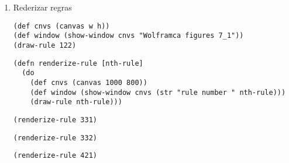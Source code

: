 \documentclass[11pt]{article}
\begin{document}
\begin{enumerate}
\begin{verbatim}
(defn draw-cells
  "Draw cells."
  [canvas rule]
  (loop [cells (init-cells cell-no)
	 row (int 0)]
    (when (< row rows)      
      (dotimes [x cell-no]
	(if (== ^int (cells x) 1)
	  (set-color canvas :black)
	  (set-color canvas :white))
	(rect canvas (* x scl) (* row scl) scl scl)
	(set-color canvas :black)
	(rect canvas (* x scl) (* row scl) scl scl true))
      (recur (next-cells cells rule)
	     (inc row)))))
\end{verbatim}

\begin{verbatim}
(def cnvs (canvas w h))
(def window (show-window cnvs "Wolframca figures 7_1"))
\end{verbatim}

\begin{verbatim}
(defn draw-rule
  "Two cases. Empty or with a rule."
  ([] (draw-rule (r/irand 256))) 
  ([rule]
   (println (str "Rule: " rule))
   (with-canvas-> cnvs
     (draw-cells (make-rule rule)))))
\end{verbatim}

\begin{verbatim}
(defmethod mouse-event
  ["Wolframca figures 7_1" :mouse-clicked] [_ _]
  (draw-rule))
\end{verbatim}

\begin{verbatim}
(draw-rule 29)
\end{verbatim}

\item Rederizar regras
\label{sec:org22935d4}
\begin{verbatim}
(def cnvs (canvas w h))
(def window (show-window cnvs "Wolframca figures 7_1"))
(draw-rule 122)
\end{verbatim}

\begin{verbatim}
(defn renderize-rule [nth-rule]
  (do
    (def cnvs (canvas 1000 800))
    (def window (show-window cnvs (str "rule number " nth-rule)))
    (draw-rule nth-rule)))
\end{verbatim}

\begin{verbatim}
(renderize-rule 331)
\end{verbatim}

\begin{verbatim}
(renderize-rule 332)
\end{verbatim}

\begin{verbatim}
(renderize-rule 421)
\end{verbatim}


\end{enumerate}
\end{document}
